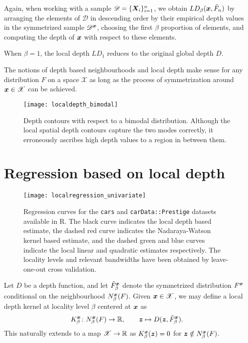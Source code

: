 Again, when working with a sample $\mathscr{D} = \{\bm{X}_i\}_{i = 1}^n$, we
obtain $LD_\beta(\bm{x}, \hat{F}_n)$ by arranging the elements of $\mathscr{D}$
in descending order by their empirical depth values in the symmetrized sample
$\mathscr{D}^{\bm{x}}$, choosing the first $\beta$ proportion of elements, and
computing the depth of $\bm{x}$ with respect to these elements.

\begin{remark}
    When $\beta = 1$, the local depth $LD_1$ reduces to the original global
    depth $D$.
\end{remark}

\begin{remark}
    The notions of depth based neighbourhoods and local depth make sense for
    any distribution $F$ on a space $\mathscr{X}$ as long as the process of
    symmetrization around $\bm{x} \in \mathscr{X}$ can be achieved.
\end{remark}


\begin{figure}
    \centering
    \texttt{[image: localdepth\_bimodal]}
    \caption{
        Depth contours with respect to a bimodal distribution.
        Although the local spatial depth contours capture the two modes
        correctly, it erroneously ascribes high depth values to a region in
        between them.
    }
    \label{fig:localdepth_bimodal}
\end{figure}


\section{Regression based on local depth}

\begin{figure}
    \centering
    \texttt{[image: localregression\_univariate]}
    \caption{
        Regression curves for the \texttt{cars} and \texttt{carData::Prestige}
        datasets available in R.
        The black curve indicates the local depth based estimate, the dashed
        red curve indicates the Nadaraya-Watson kernel based estimate, and the
        dashed green and blue curves indicate the local linear and quadratic
        estimates respectively.
        The locality levels and relevant bandwidths have been obtained by
        leave-one-out cross validation.
    }
    \label{fig:localregression_univariate}
\end{figure}

\begin{definition}
    Let $D$ be a depth function, and let $\tilde{F}^{\bm{x}}_\beta$ denote the
    symmetrized distribution $F^{\bm{x}}$ conditional on the neighbourhood
    $N^{\bm{x}}_\beta(F)$.
    Given $\bm{x} \in \mathscr{X}$, we may define a local depth kernel at
    locality level $\beta$ centered at $\bm{x}$ as
    \begin{equation}
        K^{\bm{x}}_\beta\colon N^{\bm{x}}_\beta(F) \to \mathbb{R}, \qquad
        \bm{z} \mapsto D(\bm{z}, \tilde{F}^{\bm{x}}_\beta).
    \end{equation}
    This naturally extends to a map $\mathscr{X} \to \mathbb{R}$ as
    $K^{\bm{x}}_\beta(\bm{z}) = 0$ for $\bm{z} \notin N^{\bm{x}}_\beta(F)$.
\end{definition}


